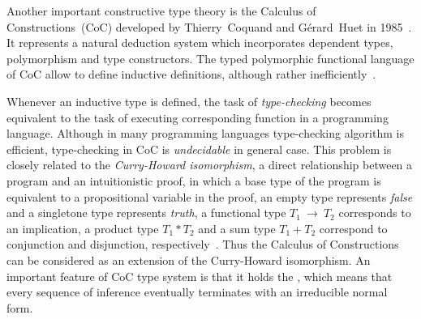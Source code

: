 \documentclass[article]{aaltoseries}
\begin{document}
Another important constructive type theory is the Calculus of Constructions~(CoC) developed by Thierry~Coquand and Gérard~Huet in 1985~\cite{Coq85}. It represents a natural deduction system which incorporates dependent types, polymorphism and type constructors. The typed polymorphic functional language of CoC allow to define inductive definitions, although rather inefficiently~\cite{Paulin15}.


Whenever an inductive type is defined, the task of \textit{type-checking} becomes equivalent to the task of executing corresponding function in a programming language. Although in many programming languages type-checking algorithm is efficient, type-checking in CoC is \textit{undecidable} in general case. This problem is closely related to the \textit{Curry-Howard isomorphism}, a direct relationship between a program and an intuitionistic proof, in which a base type of the program is equivalent to a propositional variable in the proof, an empty type represents \textit{false} and a singletone type represents \textit{truth}, a functional type $T_{1}~\rightarrow~T_{2}$ corresponds to an implication, a product type $T_{1} * T_{2}$ and a sum type $T_{1} + T_{2}$ correspond to conjunction and disjunction, respectively~\cite{Pierce2002}. Thus the Calculus of Constructions can be considered as an extension of the Curry-Howard isomorphism.
An important feature of CoC type system is that it holds the , which means that every sequence of inference eventually terminates with an irreducible normal form.

%
\end{document}

